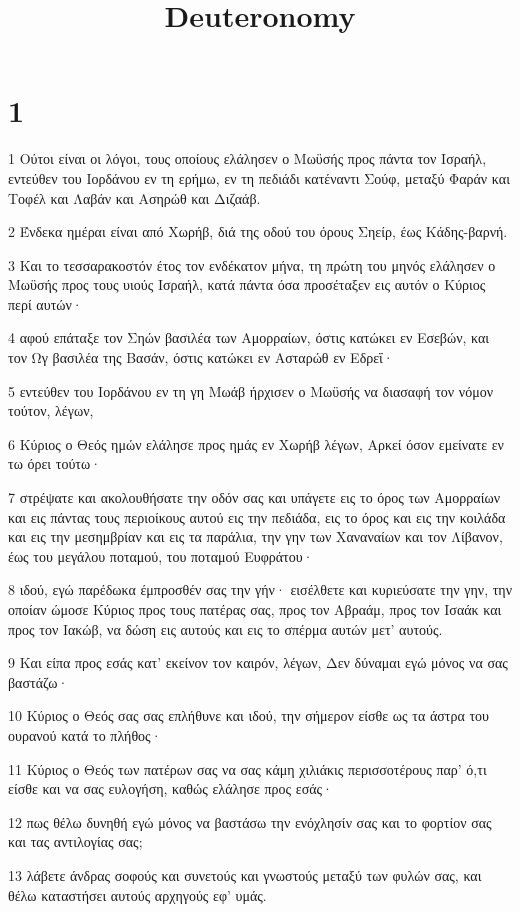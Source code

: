 

\title{Deuteronomy}


\chapter{1}

\par 1 Ούτοι είναι οι λόγοι, τους οποίους ελάλησεν ο Μωϋσής προς πάντα τον Ισραήλ, εντεύθεν του Ιορδάνου εν τη ερήμω, εν τη πεδιάδι κατέναντι Σούφ, μεταξύ Φαράν και Τοφέλ και Λαβάν και Ασηρώθ και Διζαάβ.
\par 2 Ένδεκα ημέραι είναι από Χωρήβ, διά της οδού του όρους Σηείρ, έως Κάδης-βαρνή.
\par 3 Και το τεσσαρακοστόν έτος τον ενδέκατον μήνα, τη πρώτη του μηνός ελάλησεν ο Μωϋσής προς τους υιούς Ισραήλ, κατά πάντα όσα προσέταξεν εις αυτόν ο Κύριος περί αυτών·
\par 4 αφού επάταξε τον Σηών βασιλέα των Αμορραίων, όστις κατώκει εν Εσεβών, και τον Ωγ βασιλέα της Βασάν, όστις κατώκει εν Ασταρώθ εν Εδρεΐ·
\par 5 εντεύθεν του Ιορδάνου εν τη γη Μωάβ ήρχισεν ο Μωϋσής να διασαφή τον νόμον τούτον, λέγων,
\par 6 Κύριος ο Θεός ημών ελάλησε προς ημάς εν Χωρήβ λέγων, Αρκεί όσον εμείνατε εν τω όρει τούτω·
\par 7 στρέψατε και ακολουθήσατε την οδόν σας και υπάγετε εις το όρος των Αμορραίων και εις πάντας τους περιοίκους αυτού εις την πεδιάδα, εις το όρος και εις την κοιλάδα και εις την μεσημβρίαν και εις τα παράλια, την γην των Χαναναίων και τον Λίβανον, έως του μεγάλου ποταμού, του ποταμού Ευφράτου·
\par 8 ιδού, εγώ παρέδωκα έμπροσθέν σας την γήν· εισέλθετε και κυριεύσατε την γην, την οποίαν ώμοσε Κύριος προς τους πατέρας σας, προς τον Αβραάμ, προς τον Ισαάκ και προς τον Ιακώβ, να δώση εις αυτούς και εις το σπέρμα αυτών μετ' αυτούς.
\par 9 Και είπα προς εσάς κατ' εκείνον τον καιρόν, λέγων, Δεν δύναμαι εγώ μόνος να σας βαστάζω·
\par 10 Κύριος ο Θεός σας σας επλήθυνε και ιδού, την σήμερον είσθε ως τα άστρα του ουρανού κατά το πλήθος·
\par 11 Κύριος ο Θεός των πατέρων σας να σας κάμη χιλιάκις περισσοτέρους παρ' ό,τι είσθε και να σας ευλογήση, καθώς ελάλησε προς εσάς·
\par 12 πως θέλω δυνηθή εγώ μόνος να βαστάσω την ενόχλησίν σας και το φορτίον σας και τας αντιλογίας σας;
\par 13 λάβετε άνδρας σοφούς και συνετούς και γνωστούς μεταξύ των φυλών σας, και θέλω καταστήσει αυτούς αρχηγούς εφ' υμάς.
